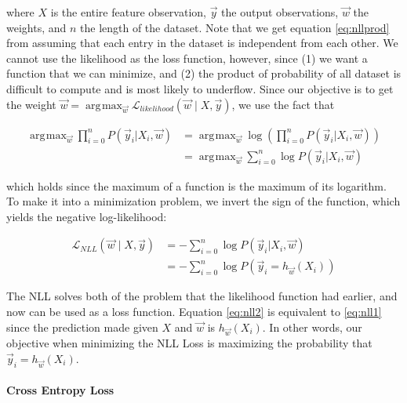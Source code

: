 \documentclass[12pt,a4paper,]{report}
\DeclareMathOperator*{\argmax}{arg\!\max}
\begin{document}
where \(X\) is the entire feature observation, \(\vec{y}\) the output
observations, \(\vec{w}\) the weights, and \(n\) the length of the
dataset. Note that we get equation \ref{eq:nllprod} from assuming that
each entry in the dataset is independent from each other. We cannot use
the likelihood as the loss function, however, since (1) we want a
function that we can minimize, and (2) the product of probability of all
dataset is difficult to compute and is most likely to underflow. Since
our objective is to get the weight
\(\vec{w} = \displaystyle \argmax_{\vec{w}} \mathcal{L}_{likelihood}(\vec{w} \mid X, \vec{y})\),
we use the fact that

\begin{align}
    \argmax_{\vec{w}} \prod_{i = 0}^{n} P(\vec{y}_i |  X_i, \vec{w}) 
    &= \argmax_{\vec{w}} \log (\prod_{i = 0}^{n} P(\vec{y}_i |  X_i, \vec{w})) \\
    &= \argmax_{\vec{w}} \sum_{i = 0}^{n} \log P(\vec{y}_i |  X_i, \vec{w})
\end{align}

which holds since the maximum of a function is the maximum of its
logarithm. To make it into a minimization problem, we invert the sign of
the function, which yields the negative log-likelihood:

\begin{align}
    \mathcal{L}_{NLL}(\vec{w} \mid X, \vec{y}) &= - \sum_{i = 0}^{n} \log P(\vec{y}_i |  X_i, \vec{w}) \label{eq:nll1} \\
    &= - \sum_{i = 0}^{n} \log P(\vec{y}_i = h_{\vec{w}}(X_i)) \label{eq:nll2}
\end{align}

The NLL solves both of the problem that the likelihood function had
earlier, and now can be used as a loss function. Equation \ref{eq:nll2}
is equivalent to \ref{eq:nll1} since the prediction made given \(X\) and
\(\vec{w}\) is \(h_{\vec{w}}(X_i)\). In other words, our objective when
minimizing the NLL Loss is maximizing the probability that
\(\vec{y}_i = h_{\vec{w}}(X_i)\).

\paragraph{Cross Entropy Loss}
\end{document}
